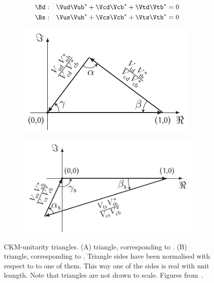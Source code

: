 \begin{subequations}
  \label{unitConstraints}
  \begin{align}
    \Bd : & \quad \Vud\Vub^* + \Vcd\Vcb^* + \Vtd\Vtb^* = 0
    \label{unitConstraints_Bd} \\
    \Bs : & \quad \Vus\Vub^* + \Vcs\Vcb^* + \Vts\Vtb^* = 0
    \label{unitConstraints_Bs}
  \end{align}
\end{subequations}

\begin{figure}[h]
  \centering
  \begin{subfigure}{0.475\textwidth}
    \raggedright
    \includegraphics[width=\textwidth]{Figures/Chapter1/b-d-triangle}
    \caption{}
    \label{unitTriangles_bd}
  \end{subfigure}%
  \begin{subfigure}{0.525\textwidth}
    \raggedleft
    \includegraphics[width=\textwidth]{Figures/Chapter1/b-s-triangle}
    \caption{}
    \label{unitTriangles_bs}
  \end{subfigure}
  \caption{CKM-unitarity triangles. (A) \Bd triangle, corresponding to . (B) \Bs triangle,
           corresponding to . Triangle sides have been normalised with respect to to one of them.
           This way one of the sides is real with unit leangth. Note that triangles are not drawn to scale. Figures from~\cite{jeroenThesis}. }
  \label{unitTriangles}
\end{figure}

